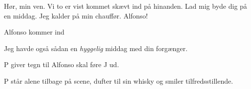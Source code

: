 \documentclass[a4paper,11pt]{article}
\begin{document}
\begin{sketch}

 Hør, min ven.  Vi to er vist kommet skævt ind på
hinanden.  Lad mig byde dig på en middag. Jeg kalder
på min chauffør. Alfonso!

\scene Alfonso kommer ind

 Jeg havde også sådan en \textit{hyggelig} middag med din
forgænger.

\scene P giver tegn til Alfonso skal føre J ud.

\scene P står alene tilbage på scene, dufter til sin whisky og smiler
tilfredsstillende.


\end{sketch}
\end{document}
